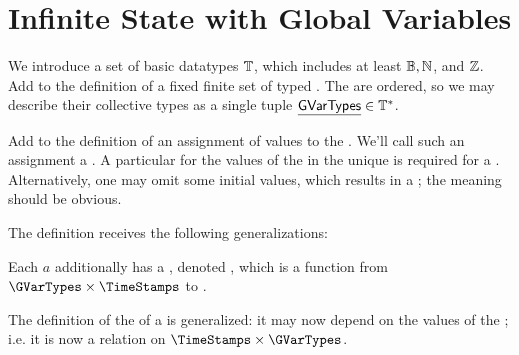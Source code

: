 \documentclass[12pt]{article}
\begin{document}
\section{Infinite State with Global Variables} \label{globalvars}
\medskip




We introduce a set of basic datatypes $\mathbb{T}$, which includes at least $\mathbb{B}, \mathbb{N}$, and $\mathbb{Z}$. Add to the definition of \Contract a fixed finite set of typed . The \GVars are ordered, so we may describe their collective types as a single tuple $\underline{{\sf GVarTypes}} \in \mathbb{T}^* $.

Add to the definition of \GlobalState an assignment of values to the \GVars. We'll call such an assignment a . A particular \gvarsassign {} for the values of the \GVars in the unique \startstate is required for a \Contract. Alternatively, one may omit some initial values, which results in a ; the meaning should be obvious.



 The \Event definition receives the following generalizations:
\begin{LPPI}
\item Each \Action $a$ additionally has a \gvTransform, denoted , which is a function from 
$\GVarTypes \times \TimeStamps$ to \GVarTypes. 
\item The definition of the \TGuard of a  is generalized: it may now depend on the values of the \GVars; i.e. it is now a relation on $\TimeStamps \times \GVarTypes$.
\end{LPPI}
\end{document}

